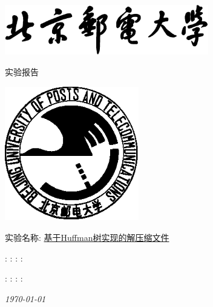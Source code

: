 \begin{titlepage}
    \center
    \includegraphics[width=3.5in]{images/buptname.eps}

    \begin{spacing}{5}
        {\bigsize 实验报告}
    \end{spacing}

    \includegraphics[width=2.3in]{images/buptseal.eps}

    \begin{spacing}{1}
        \vspace{2.5cm}
        \Large{实验名称:} \underline{基于Huffman树实现的解压缩文件}
        \vspace{3cm}
    \end{spacing}

    \begin{minipage}{\linewidth}
         : \underline{}
         : \underline{}
         : \underline{}
         : \underline{}
    \end{minipage}

    \begin{minipage}{\linewidth}
         : \underline{}
         : \underline{}
         : \underline{}
         : \underline{}
    \end{minipage}

    {\small\em \today }
\end{titlepage}

